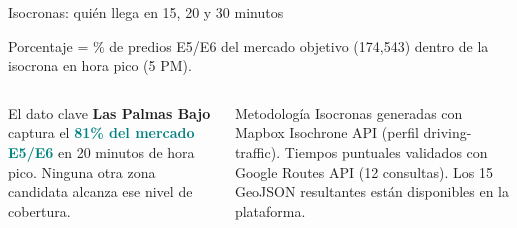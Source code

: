 \documentclass[aspectratio=169, 11pt]{beamer}
\newcommand{\highlight}[1]{\textcolor{teal}{\textbf{#1}}}
\newcommand{\src}[1]{\par\vspace{2pt}{\tiny\textcolor{slate}{Fuente: #1}}}
\begin{document}
\begin{frame}{Isocronas: quién llega en 15, 20 y 30 minutos}
\begin{center}
\end{center}

\vspace{4pt}
{\scriptsize\textcolor{slate}{Porcentaje = \% de predios E5/E6 del mercado objetivo (174,543) dentro de la isocrona en hora pico (5 PM).}}

\vspace{6pt}
\begin{columns}[T]
\begin{exampleblock}{\small El dato clave}
\scriptsize \textbf{Las Palmas Bajo} captura el \highlight{81\% del mercado E5/E6} en 20 minutos de hora pico. Ninguna otra zona candidata alcanza ese nivel de cobertura.
\end{exampleblock}
\begin{block}{\small Metodología}
\scriptsize Isocronas generadas con Mapbox Isochrone API (perfil driving-traffic). Tiempos puntuales validados con Google Routes API (12 consultas). Los 15 GeoJSON resultantes están disponibles en la plataforma.
\end{block}
\end{columns}

\src{Mapbox Isochrone API v1, Google Routes API v2. Validación cruzada en 12 pares origen-destino.}
\end{frame}
\end{document}
